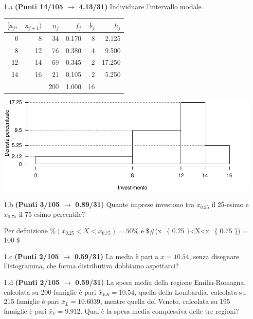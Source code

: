 \documentclass[
  11pt,
]{book}
\theoremstyle{mytheoremstyle}
\theoremstyle{mydefstyle}
\newenvironment{sol}
  {
  \begin{tcolorbox}[enhanced,breakable,arc=0.1mm,boxrule=1pt,colback=white,colframe=iblue,
  title=\bf \fontfamily{lmss}\selectfont \hspace{.5 cm} Soluzione,drop fuzzy shadow]

}{
\end{tcolorbox}
  }
\begin{document}
1.a \textbf{(Punti 14/105 \(\rightarrow\) 4.13/31)} Individuare l'intervallo modale.

\begin{sol}

\begin{table}[H]
\centering
\begin{tabular}{rrrrrr}
\toprule
$[\text{x}_j,$ & $\text{x}_{j+1})$ & $n_j$ & $f_j$ & $b_j$ & $h_j$\\
\midrule
0 & 8 & 34 & 0.170 & 8 & 2.125\\
8 & 12 & 76 & 0.380 & 4 & 9.500\\
12 & 14 & 69 & 0.345 & 2 & 17.250\\
14 & 16 & 21 & 0.105 & 2 & 5.250\\
 &  & 200 & 1.000 & 16 & \\
\bottomrule
\end{tabular}
\end{table}

\begin{center}\includegraphics{Esami_passati_con_soluzioni_files/figure-latex/2024-116-1} \end{center}

\end{sol}

1.b \textbf{(Punti 3/105 \(\rightarrow\) 0.89/31)} Quante imprese investono tra \(x_{0.25}\) il 25-esimo e \(x_{0.75}\) il 75-esimo percentile?

\begin{sol}
Per definizione \(\%(x_{ 0.25 }<X<x_{ 0.75 })= 50 \%\) e
\$\#(x\_\{ 0.25 \}\textless X\textless x\_\{ 0.75 \})  = 100 \$

\end{sol}

1.c \textbf{(Punti 2/105 \(\rightarrow\) 0.59/31)} La media è pari a \(\bar x=10.54\), senza disegnare l'istogramma, che forma distributiva dobbiamo aspettarci?

1.d \textbf{(Punti 2/105 \(\rightarrow\) 0.59/31)} La spesa media della regione Emilia-Romagna, calcolata su 200 famiglie è pari \(\bar x_{ER}=10.54\), quella della Lombardia, calcolata su 215 famiglie è pari \(\bar x_{L}=10.6039\), mentre quella del Veneto, calcolata su 195 famiglie è pari \(\bar x_{V}=9.912\). Qual è la spesa media complessiva delle tre regioni?
\end{document}
